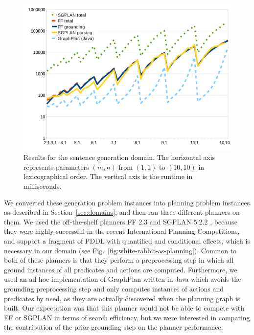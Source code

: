 \begin{figure}
  \centering
  \includegraphics[width=0.75\columnwidth]{graph-exp1}
  \caption{Results for the sentence generation domain. The
    horizontal axis represents parameters $(m,n)$ from $(1,1)$ to
    $(10,10)$ in lexicographical order. The vertical axis is the
    runtime in milliseconds.}
  \label{fig:runtimes-crisp}
\end{figure}

We converted these generation problem instances into planning problem
instances as described in Section~\ref{sec:domains}, and then ran
three different planners on them. We used the off-the-shelf planners
FF 2.3 \citep{HoffmannNebel01} and SGPLAN 5.2.2
\citep{hsu06:_new_featur_in_sgplan_for}, because they were highly
successful in the recent International Planning Competitions, and
support a fragment of PDDL with quantified and conditional effects,
which is necessary in our domain (see
Fig.~\ref{fig:white-rabbit-as-planning}). Common to both of these
planners is that they perform a preprocessing step in which all ground
instances of all predicates and actions are computed.  Furthermore, we
used an ad-hoc implementation of GraphPlan \citep{Blum1997} written in
Java which avoids the grounding preprocessing step and only computes
instances of actions and predicates by need, as they are actually
discovered when the planning graph is built. Our expectation was that
this planner would not be able to compete with FF or SGPLAN in terms
of search efficiency, but we were interested in comparing the
contribution of the prior grounding step on the planner performance.

